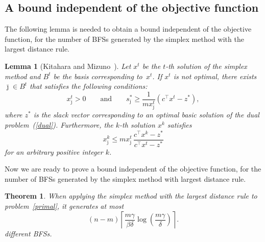 \documentclass[12pt]{article}
\newtheorem{lemma}{Lemma}[section]
\newtheorem{theorem}{Theorem}[section]
\begin{document}
\subsection{A bound independent of the objective function}
The following lemma is needed to obtain a bound independent of the objective function, for the number of BFSs generated by the simplex method with the largest distance rule.
\begin{lemma}[Kitahara and Mizuno~\cite{km2013}] \label{lem:Non-Optimal-Variable-Upper-Bound}
Let $x^{t}$ be the $t$-th solution of the simplex method and $B^t$ be the basis corresponding to~$x^{t}$.
If $x^t$ is not optimal, there exists $\bar{\jmath}\in B^t$ that satisfies the following conditions:
\begin{equation} \label{eq:Optimal-Dual-Slack-Lower-Bound}
  x_{\bar{\jmath}}^t > 0 \qquad \text{and} \qquad s_{\bar{\jmath}}^* \ge \frac{1}{m x_{\bar{\jmath}}^t} \left( c^{\top} x^t - z^* \right),
\end{equation}
where $z^*$ is the slack vector corresponding to an optimal basic solution of the dual problem~(\ref{dual}).
Furthermore, the $k$-th solution $x^{k}$ satisfies
\begin{equation} \label{eq:Non-Optimal-Variable-Upper-Bound}
  x_{\bar{\jmath}}^{k} \le m x_{\bar{\jmath}}^t \, \frac{c^{\top} x^{k} - z^*}{c^{\top} x^t - z^*}
\end{equation}
for an arbitrary positive integer $k$.
\end{lemma}
%
Now we are ready to prove a bound independent of the objective function, for the number of BFSs generated by the simplex method with largest distance rule.
%
\begin{theorem} \label{thm:Upper-Bound-Without-Objective-Function-Ratio}
When applying the simplex method with the largest distance rule to problem~\eqref{primal}, it generates at most
\begin{equation} \label{eq:Upper-Bound-Without-Objective-Function-Ratio}
  (n-m) \left\lceil \frac{m\gamma}{\beta \delta} \log\left(\frac{m\gamma}{\delta}\right) \right\rceil.
\end{equation}
different BFSs.
\end{theorem}
%
\end{document}
